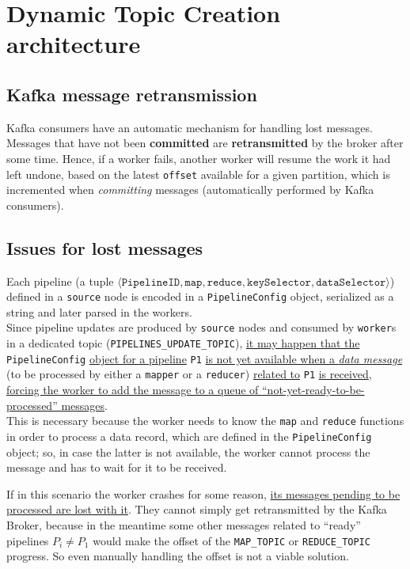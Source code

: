 
\section{Dynamic Topic Creation architecture}
\subsection{Kafka message retransmission}
Kafka consumers have an automatic mechanism for handling lost messages. Messages that have not been \textbf{committed} are \textbf{retransmitted} by the broker after some time. Hence, if a worker fails, another worker will resume the work it had left undone, based on the latest \texttt{offset} available for a given partition, which is incremented when \textit{committing} messages (automatically performed by Kafka consumers).

\subsection{Issues for lost messages}
Each pipeline (a tuple $\langle \texttt{PipelineID}, \texttt{map}, \texttt{reduce}, \texttt{keySelector}, \texttt{dataSelector} \rangle$) defined in a \texttt{source} node is encoded in a \lstinline|PipelineConfig| object, serialized as a string and later parsed in the workers.\\ 
Since pipeline updates are produced by \texttt{source} nodes and consumed by \texttt{worker}s in a dedicated topic (\lstinline|PIPELINES_UPDATE_TOPIC|), \ul{it may happen that the} \lstinline|PipelineConfig| \ul{object for a pipeline} \lstinline|P1| \ul{is not yet available when a \textit{data message}} (to be processed by either a \texttt{mapper} or a \texttt{reducer}) \ul{related to} \lstinline|P1| \ul{is received}, \ul{forcing the worker to add the message to a queue of ``not-yet-ready-to-be-processed'' messages}.\\
This is necessary because the worker needs to know the \lstinline|map| and \lstinline|reduce| functions in order to process a data record, which are defined in the \lstinline|PipelineConfig| object;
so, in case the latter is not available, the worker cannot process the message and has to wait for it to be received.

If in this scenario the worker crashes for some reason, \ul{its messages pending to be processed are lost with it}.
They cannot simply get retransmitted by the Kafka Broker, because in the meantime some other messages related to ``ready'' pipelines $P_i \neq P_1$ would make the offset of the \lstinline|MAP_TOPIC| or \lstinline|REDUCE_TOPIC| progress.
So even manually handling the offset is not a viable solution.

